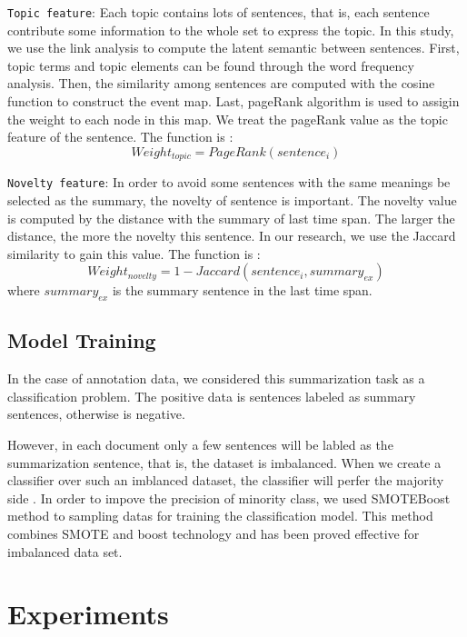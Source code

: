 \documentclass[print]{jicspack}
\begin{document}
\texttt{Topic feature}: Each topic contains lots of sentences, that is, each sentence contribute some information to the whole set to express the topic. In this study, we use the link analysis to compute the latent semantic between sentences. First, topic terms and topic elements can be found through the word frequency analysis. Then, the similarity among sentences are computed with the cosine function to construct the event map. Last, pageRank algorithm is used to assigin the weight to each node in this map. We treat the pageRank value as the topic feature of the sentence. The function is :
\begin{equation}
Weight_{topic} = PageRank(sentence_i)
\end{equation}

\texttt{Novelty feature}: In order to avoid some sentences with the same meanings be selected as the summary, the novelty of sentence is important. 
The novelty value is computed by the distance with the summary of last time span. 
The larger the distance, the more the novelty this sentence. 
In our research, we use the Jaccard similarity to gain this value. The function is :
\begin{equation}
Weight_{novelty} = 1 - Jaccard(sentence_i, summary_{ex})
\end{equation}
where $summary_{ex}$ is the summary sentence in the last time span.



\subsection{Model Training}

In the case of annotation data, we considered this summarization task as a classification problem. The positive data is sentences labeled as summary sentences, otherwise is negative. 

However, in each document only a few sentences will be labled as the summarization sentence, that is, the dataset is imbalanced. 
When we create a classifier over such an imblanced dataset, the classifier will perfer the majority side \cite{chawla2003smoteboost}.
In order to impove the precision of minority class, we used SMOTEBoost\cite{chawla2003smoteboost} method to sampling datas for training the classification model. 
This method combines SMOTE \cite{chawla2011smote} and boost technology and has been proved effective for imbalanced data set. 


%
\section{Experiments}
%
\end{document}
